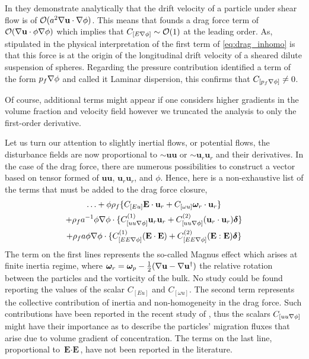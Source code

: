 In \citet{wang1999longitudinal} they demonstrate analytically that the drift velocity of a particle under shear flow is of $\mathcal{O}(a^2 \mathbf{\nabla} \textbf{u}\cdot \mathbf{\nabla} \phi)$.
This means that \citet{wang1999longitudinal} founds a drag force term of  $\mathcal{O}( \mathbf{\nabla} \textbf{u} \cdot \phi \mathbf{\nabla} \phi)$ which implies that $C_{[E \mathbf{\nabla}\phi ]} \sim \mathcal{O}(1)$ at the leading order. 
As, stipulated in \citet{wang1999longitudinal,guazzelli2011} the physical interpretation of the first term of \ref{eq:drag_inhomo} is that this force is at the origin of the longitudinal drift velocity of a sheared dilute suspension of spheres. 
Regarding the pressure contribution \citet{du2020bubble} identified a term of the form $p_f \mathbf{\nabla} \phi$ and called it Laminar dispersion, this confirms that $C_{[p_f \mathbf{\nabla}\phi ]}\neq 0$. 

Of course, additional terms might appear if one considers higher gradients in the volume fraction and velocity field however we truncated the analysis to only the first-order derivative. 

Let us turn our attention to slightly inertial flows, or potential flows, the disturbance fields are now proportional to $\sim \textbf{uu}$ or $\sim \textbf{u}_r \textbf{u}_r$ and their derivatives. 
In the case of the drag force, there are numerous possibilities to construct a vector based on tensor formed of $\textbf{uu}$, $\textbf{u}_r\textbf{u}_r$, and $\phi$. 
Hence, here is a non-exhaustive list of the terms that must be added to the drag force closure, 
\begin{multline}
    \ldots
    + \phi \rho_f \{  C_{[E u]} \textbf{E} \cdot \textbf{u}_{r} 
    + C_{[\omega u]} \bm\omega_r \cdot \textbf{u}_{r} \}\\
    + \rho_f a^{-1}  \phi \mathbf{\nabla}\phi \cdot \{ C_{[uu\mathbf{\nabla}\phi]}^{(1)} \textbf{u}_{r}\textbf{u}_{r}
    +  C_{[uu\mathbf{\nabla}\phi]}^{(2)} (\textbf{u}_{r}\cdot \textbf{u}_{r})\bm\delta\} \\
    + \rho_f a  \phi \mathbf{\nabla}\phi \cdot \{ C_{[EE\mathbf{\nabla}\phi]}^{(1)} (\textbf{E} \cdot  \textbf{E}) 
    +  C_{[EE\mathbf{\nabla}\phi]}^{(2)} (\textbf{E} : \textbf{E})\bm\delta \}
\end{multline}
The term on the first lines represents the so-called Magnus effect which arises at finite inertia regime, where $\bm\omega_r = \bm\omega_p - \frac{1}{2}(\mathbf{\nabla} \textbf{u}-\mathbf{\nabla} \textbf{u}^\dagger)$ the relative rotation between the particles and the vorticity of the bulk. 
No study could be found reporting the values of the scalar $C_{[Eu]}$  and $C_{[\omega u]}$. 
The second term represents the collective contribution of inertia and non-homogeneity in the drag force. 
Such contributions have been reported in the recent study of \citet{wang2024effect}, thus the scalars $C_{[uu\mathbf{\nabla}\phi]}$ might have their importance as to describe the particles' migration fluxes that arise due to volume gradient of concentration. 
The terms on the last line, proportional to $\textbf{E}\cdot \textbf{E}$, have not been reported in the literature. 





